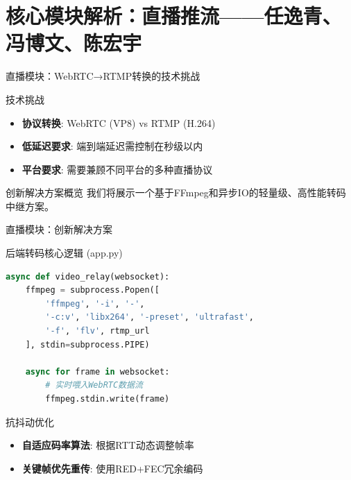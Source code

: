 \documentclass{beamer}
\begin{document}
\section{核心模块解析：直播推流——任逸青、冯博文、陈宏宇}

\begin{frame}{直播模块：WebRTC→RTMP转换的技术挑战}
    \begin{block}{技术挑战}
        \begin{itemize}
            \item \textbf{协议转换}: WebRTC (VP8) vs RTMP (H.264)
            \item \textbf{低延迟要求}: 端到端延迟需控制在秒级以内
            \item \textbf{平台要求}: 需要兼顾不同平台的多种直播协议
        \end{itemize}
    \end{block}
    \begin{exampleblock}{创新解决方案概览}
        我们将展示一个基于FFmpeg和异步IO的轻量级、高性能转码中继方案。
    \end{exampleblock}
\end{frame}

\begin{frame}[fragile]{直播模块：创新解决方案}
    \begin{block}{后端转码核心逻辑 (app.py)}
\begin{lstlisting}[language=Python]
async def video_relay(websocket):
    ffmpeg = subprocess.Popen([
        'ffmpeg', '-i', '-', 
        '-c:v', 'libx264', '-preset', 'ultrafast',
        '-f', 'flv', rtmp_url
    ], stdin=subprocess.PIPE)
  
    async for frame in websocket:
        # 实时喂入WebRTC数据流
        ffmpeg.stdin.write(frame)
\end{lstlisting}
    \end{block}
    
    \begin{block}{抗抖动优化}
        \begin{itemize}
            \item \textbf{自适应码率算法}: 根据RTT动态调整帧率
            \item \textbf{关键帧优先重传}: 使用RED+FEC冗余编码
        \end{itemize}
    \end{block}
\end{frame}
\end{document}
